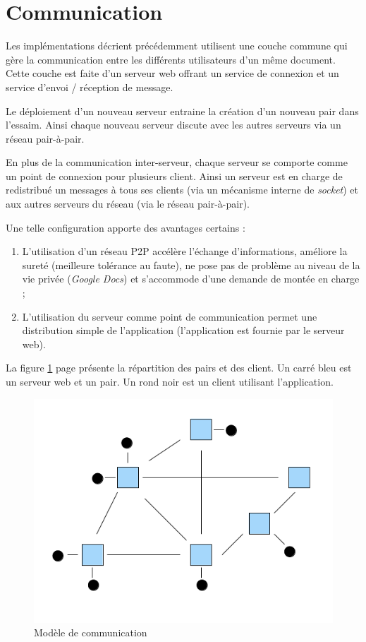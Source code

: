 \section{Communication}
Les implémentations décrient précédemment utilisent une couche commune qui gère
la communication entre les différents utilisateurs d'un même document. Cette
couche est faite d'un serveur web offrant un service de connexion et un service
d'envoi / réception de message.

Le déploiement d'un nouveau serveur entraine la création d'un nouveau pair
dans l'essaim. Ainsi chaque nouveau serveur discute avec les autres serveurs
via un réseau pair-à-pair. 

En plus de la communication inter-serveur, chaque
serveur se comporte comme un point de connexion pour plusieurs client. Ainsi
un serveur est en charge de redistribué un messages à tous ses clients (via
un mécanisme interne de \emph{socket}) et aux autres serveurs du réseau (via
le réseau pair-à-pair).

Une telle configuration apporte des avantages certains :
\begin{enumerate}
 \item L'utilisation d'un réseau P2P accélère l'échange d'informations,
 améliore la sureté (meilleure tolérance au faute), ne pose pas de problème
 au niveau de la vie privée (\emph{Google Docs}) et s'accommode d'une demande
 de montée en charge ;
 \item L'utilisation du serveur comme point de communication permet une
 distribution simple de l'application (l'application est fournie par le
 serveur web).
\end{enumerate}

La figure \ref{fig:commu} page \pageref{fig:commu} présente la répartition des
pairs et des client. Un carré bleu est un serveur web et un pair. Un rond noir
est un client utilisant l'application.

\begin{figure}[hbt]
  \center
  \includegraphics[width=.8\textwidth]{includes/network-model.png}
  \caption{Modèle de communication}
  \label{fig:commu}
\end{figure}

